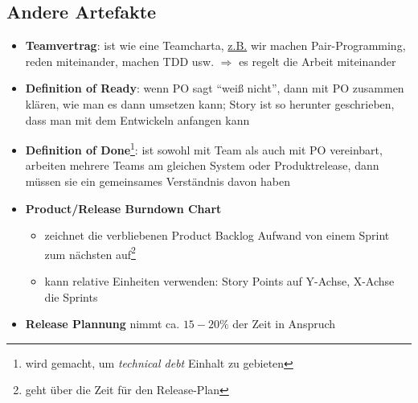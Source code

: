 \subsection{Andere Artefakte}
\begin{itemize}
  \item \textbf{Teamvertrag}: ist wie eine Teamcharta, \uline{z.B.} wir machen
    Pair-Programming, reden miteinander, machen TDD usw. $\Rightarrow$  es regelt die Arbeit
    miteinander
  \item \textbf{Definition of Ready}: wenn PO sagt \enquote{weiß nicht}, dann mit PO zusammen
    klären, wie man es dann umsetzen kann; Story ist so herunter geschrieben, dass man mit dem
    Entwickeln anfangen kann
  \item \textbf{Definition of Done}\footnote{wird gemacht, um \textit{technical debt} Einhalt zu
      gebieten}: ist sowohl mit Team als auch mit PO vereinbart, arbeiten
    mehrere Teams am gleichen System oder Produktrelease, dann müssen sie ein gemeinsames Verständnis davon haben
  \item \textbf{Product/Release Burndown Chart}
  \begin{itemize}
    \item zeichnet die verbliebenen Product Backlog Aufwand von einem Sprint zum nächsten
      auf\footnote{geht über die Zeit für den Release-Plan}
    \item kann relative Einheiten verwenden: Story Points auf Y-Achse, X-Achse die Sprints
  \end{itemize}
  \item \textbf{Release Plannung} nimmt ca. $15-20 \%$ der Zeit in Anspruch
\end{itemize}
\pagebreak


